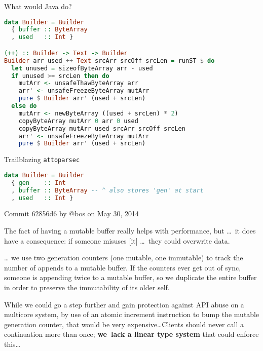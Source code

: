 \documentclass[handout]{beamer}
\begin{document}
\begin{frame}[fragile]{What would Java do?}

\begin{lstlisting}[language=Haskell]
data Builder = Builder
  { buffer :: ByteArray
  , used   :: Int }

(++) :: Builder -> Text -> Builder
Builder arr used ++ Text srcArr srcOff srcLen = runST $ do
  let unused = sizeofByteArray arr - used
  if unused >= srcLen then do
    mutArr <- unsafeThawByteArray arr
    arr' <- unsafeFreezeByteArray mutArr
    pure $ Builder arr' (used + srcLen)
  else do
    mutArr <- newByteArray ((used + srcLen) * 2)
    copyByteArray mutArr 0 arr 0 used
    copyByteArray mutArr used srcArr srcOff srcLen
    arr' <- unsafeFreezeByteArray mutArr
    pure $ Builder arr' (used + srcLen)
\end{lstlisting}

\end{frame}

\begin{frame}[fragile]{Trailblazing {\tt attoparsec}}

\vspace{-1.7ex}

\begin{lstlisting}[language=Haskell]
data Builder = Builder
  { gen    :: Int
  , buffer :: ByteArray -- ^ also stores 'gen' at start
  , used   :: Int }
\end{lstlisting}

\vspace{-1.7ex}

\begin{block}{Commit 62856d6 by @bos on May 30, 2014}
\small

The fact of having a mutable buffer really helps with performance,
but \dots\ {it does have a consequence: }if someone misuses [it] \dots\ they could overwrite data.


\dots
we use
two generation counters (one mutable, one immutable) to track the
number of appends to a mutable buffer. If the counters ever get out
of sync, someone is appending twice to a mutable buffer, so we
duplicate the entire buffer in order to preserve the immutability
of its older self.

While we could go a step further and gain protection against API
abuse on a multicore system, by use of an atomic increment
instruction to bump the mutable generation counter, that would be
very expensive\dots Clients should never call a continuation more than
once; {\bf we~lack a linear type system} that could enforce this\dots
\end{block}

\end{frame}
\end{document}
